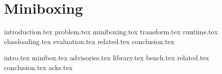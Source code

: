 \chapter{Miniboxing}
\label{chapter:miniboxing}

{introduction.tex}
{problem.tex}
{miniboxing.tex}
{transform.tex}
{runtime.tex}
{classloading.tex}
{evaluation.tex}
{related.tex}
{conclusion.tex}

{intro.tex}
{minibox.tex}
{advisories.tex}
{library.tex}
{bench.tex}
{related.tex}
{conclusion.tex}
{acks.tex}

